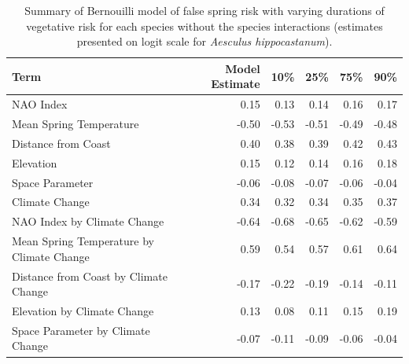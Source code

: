 \documentclass{article}\usepackage[]{graphicx}\usepackage[]{color}
\begin{document}
{%
\begin{table}[H]
\centering
\caption{Summary of Bernouilli model of false spring risk with varying durations of vegetative risk for each species without the species interactions (estimates presented on logit scale for \textit{Aesculus hippocastanum}).} 
\begin{tabular}{lrrrrr}
  \hline
Term & Model Estimate & 10\% & 25\% & 75\% & 90\% \\ 
  \hline
NAO Index & 0.15 & 0.13 & 0.14 & 0.16 & 0.17 \\ 
  Mean Spring 
Temperature & -0.50 & -0.53 & -0.51 & -0.49 & -0.48 \\ 
  Distance from 
Coast & 0.40 & 0.38 & 0.39 & 0.42 & 0.43 \\ 
  Elevation & 0.15 & 0.12 & 0.14 & 0.16 & 0.18 \\ 
  Space Parameter & -0.06 & -0.08 & -0.07 & -0.06 & -0.04 \\ 
  Climate Change & 0.34 & 0.32 & 0.34 & 0.35 & 0.37 \\ 
  NAO Index by Climate Change & -0.64 & -0.68 & -0.65 & -0.62 & -0.59 \\ 
  Mean Spring 
Temperature by Climate Change & 0.59 & 0.54 & 0.57 & 0.61 & 0.64 \\ 
  Distance from 
Coast by Climate Change & -0.17 & -0.22 & -0.19 & -0.14 & -0.11 \\ 
  Elevation by Climate Change & 0.13 & 0.08 & 0.11 & 0.15 & 0.19 \\ 
  Space Parameter by Climate Change & -0.07 & -0.11 & -0.09 & -0.06 & -0.04 \\ 
   \hline
\end{tabular}
\end{table}


}
\end{document}

